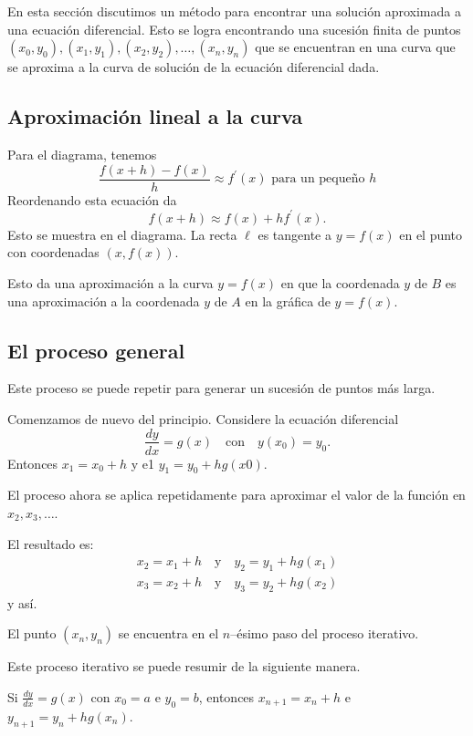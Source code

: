 En esta sección discutimos un método para encontrar una solución aproximada a una ecuación diferencial. Esto se logra encontrando una sucesión finita de puntos $(x_{0},y_{0}),(x_{1},y_{1}),(x_{2},y_{2}),\ldots,(x_{n},y_{n})$ que se encuentran en una curva que se aproxima a la curva de solución de la ecuación diferencial dada.

\subsection{Aproximación lineal a la curva}
Para el diagrama, tenemos \[ \frac{f\left(x+h\right)-f\left(x\right)}{h}\approx f^{\prime}\left(x\right)\text{ para un pequeño }h \] Reordenando esta ecuación da \[ f\left(x+h\right)\approx f\left(x\right)+hf^{\prime}\left(x\right). \]
Esto se muestra en el diagrama. La recta $\ell$ es tangente a $y=f(x)$ en el punto con coordenadas $(x,f(x))$.

Esto da una aproximación a la curva $y=f(x)$ en que la coordenada $y$ de $B$ es una
aproximación a la coordenada $y$ de $A$ en la gráfica de $y=f(x)$.
\subsection{El proceso general}
Este proceso se puede repetir para generar un sucesión de puntos más larga.


Comenzamos de nuevo del principio. Considere la ecuación diferencial
\[ \frac{dy}{dx}=g\left(x\right)\quad\text{con}\quad y\left(x_{0}\right)=y_{0}. \]
Entonces $x_{1}=x_{0}+h$ y e1 $y_{1}=y_{0}+hg(x0)$.

El proceso ahora se aplica repetidamente para aproximar el valor de la función en $x_{2},x_{3},\ldots$.

El resultado es:
\begin{align*}
x_{2}=x_{1}+h\quad\text{y}\quad y_{2}=y_{1}+hg(x_{1})\\
x_{3}=x_{2}+h\quad\text{y}\quad y_{3}=y_{2}+hg(x_{2})
\end{align*}
y así.

El punto $\left(x_{n},y_{n}\right)$ se encuentra en el $n$--ésimo paso del proceso iterativo.

Este proceso iterativo se puede resumir de la siguiente manera.

\begin{theorem}
	Si $\frac{dy}{dx}=g\left(x\right)$ con $x_{0}=a$ e $y_{0}=b$, entonces $x_{n+1}=x_{n}+h$ e $y_{n+1}=y_{n}+hg\left(x_{n}\right)$.
\end{theorem}

